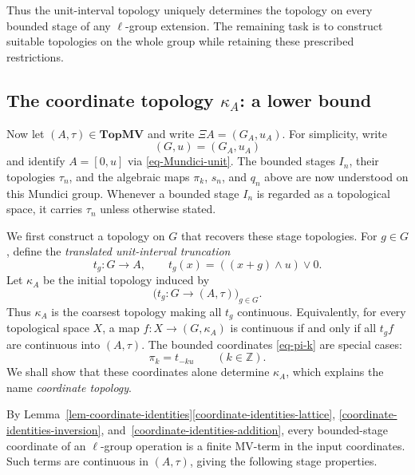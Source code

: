 \documentclass[preprint,3p]{elsarticle}
\theoremstyle{plain}
\theoremstyle{definition}
\newcommand{\TopMV}{\mathbf{TopMV}}
\numberwithin{equation}{section}
\begin{document}
Thus the unit-interval topology uniquely determines the topology
on every bounded stage of any $\ell$-group extension.  The remaining
task is to construct suitable topologies on the whole group while
retaining these prescribed restrictions.

\subsection{The coordinate topology
\texorpdfstring{$\kappa_A$}{kappa\_A}: a lower bound}
\label{sec-coordinate-topology}

Now let $(A,\tau)\in\TopMV$ and write $\Xi A=(G_A,u_A)$.
For simplicity, write 
\[
 (G,u)=(G_A,u_A)
\]
and identify
$A=[0,u]$ via \eqref{eq-Mundici-unit}.
The bounded stages $I_n$, their topologies $\tau_n$, and the
algebraic maps $\pi_k$, $s_n$, and $q_n$ above are now understood
on this Mundici group.
Whenever a bounded stage $I_n$ is regarded as a topological space,
it carries $\tau_n$ unless otherwise stated.

We first construct a topology on $G$ that recovers these stage
topologies.  For $g\in G$, define the
\emph{translated unit-interval truncation}
\begin{equation}
\label{eq-translated-truncation}
 t_g\colon G\longrightarrow A,
 \qquad t_g(x)=((x+g)\wedge u)\vee0.
\end{equation}
Let $\kappa_A$ be the initial topology induced by
\begin{equation}
\label{eq-translated-initial-family}
 \bigl(t_g\colon G\longrightarrow(A,\tau)\bigr)_{g\in G}.
\end{equation}
Thus $\kappa_A$ is the coarsest topology making all $t_g$
continuous.  Equivalently, for every topological space $X$, a map
$f\colon X\longrightarrow(G,\kappa_A)$ is continuous if and
only if all $t_gf$ are continuous into $(A,\tau)$.
The bounded coordinates \eqref{eq-pi-k} are special cases:
\[
 \pi_k=t_{-ku}\qquad(k\in\mathbb Z).
\]
We shall show that these coordinates alone determine $\kappa_A$,
which explains the name \emph{coordinate topology}.

By Lemma~\ref{lem-coordinate-identities}\ref{coordinate-identities-lattice},
\ref{coordinate-identities-inversion}, and~\ref{coordinate-identities-addition}, every bounded-stage
coordinate of an $\ell$-group operation is a finite MV-term
in the input coordinates.  Such terms are continuous in
$(A,\tau)$, giving the following stage properties.
\end{document}
